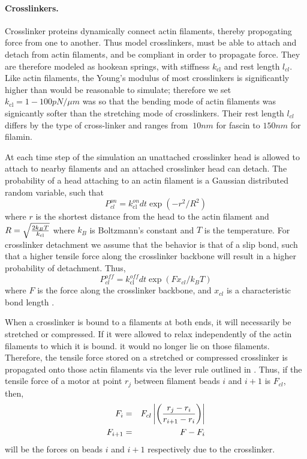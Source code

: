 \documentclass[11pt]{article}
\begin{document}
\paragraph{{\bf Crosslinkers.}}
Crosslinker proteins dynamically connect actin filaments, thereby propogating force from one to
another. Thus model crosslinkers, must be able to attach and detach from actin filaments,
and be compliant in order to propagate force. They are therefore modeled as hookean springs, with stiffness
$k_\text{cl}$ and rest length $l_{cl}$. Like actin filaments, the Young's modulus of
most crosslinkers is significantly higher than would be reasonable to simulate; therefore we set $k_\text{cl} = 1-100pN/\mu m$ was
so that the bending mode of actin filaments was signicantly softer than the stretching mode of
crosslinkers. Their rest length $l_{cl}$ differs by the type of cross-linker and ranges from $~10 nm$ for fascin to $150 nm$
for filamin. 
\par
At each time step of the simulation an unattached crosslinker head is allowed to attach to nearby
filaments and an attached crosslinker head can detach. 
The probability of a head attaching to an actin filament is a Gaussian distributed random variable, such that
\begin{equation}
  P_{cl}^{on} = k_\text{cl}^{on}dt\exp(-r^2/R^2)
  \label{eqn:cl_on}
\end{equation} 
where $r$ is the shortest distance from the head to the actin filament and $R = \sqrt{2k_B T\over k_\text{cl}}$ 
where $k_B$ is Boltzmann's constant and $T$ is the temperature. 
For crosslinker detachment we assume that the behavior is that of a slip bond, such that a higher
tensile force along the crosslinker backbone will result in a higher probability of detachment. Thus, 
\begin{equation}
  P_{cl}^{off} = k_\text{cl}^{off} dt\exp{\left(  F x_{cl}/k_B T\right)}  
  \label{eqn:cl_off}
\end{equation}
where $F$ is the force along the crosslinker backbone, and $x_{cl}$ is a characteristic bond length \cite{stam2015}. 
\par
When a crosslinker is bound to a filaments at both ends, it will necessarily be stretched or compressed. 
If it were allowed to relax independently of the actin filaments to which it is bound. 
it would no longer lie on those filaments. Therefore, the tensile force stored on a stretched or compressed
crosslinker is propagated onto those actin filaments via the lever rule outlined in 
\cite{nedelec2002, gordon2012}. Thus, if the tensile force of a motor at point $r_j$ between filament beads $i$ and $i+1$ is
$F_{cl}$, then, 
\begin{eqnarray} 
  F_i &=& F_{cl}\left|\left( {r_j - r_i \over r_{i+1} - r_i }\right)\right|\\\nonumber
  F_{i+1} &=& F-F_i 
  \label{eqn:lever}
\end{eqnarray}
will be the forces on beads $i$ and $i+1$ respectively due to the crosslinker.
\end{document}
